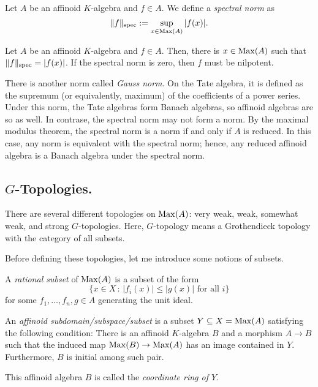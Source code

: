\documentclass{amsart}
\begin{document}
\begin{defn}
    Let $A$ be an affinoid $K$-algebra and $f \in A$. We define a \textit{spectral norm} as
    $$ \|f\|_{\operatorname{spec}} := \sup_{x \in \operatorname{Max}(A)} |f(x)|. $$
\end{defn}

\begin{thm}
    Let $A$ be an affinoid $K$-algebra and $f \in A$. Then, there is $x \in \operatorname{Max}(A)$ such that $\|f\|_{\operatorname{spec}} = |f(x)|$. If the spectral norm is zero, then $f$ must be nilpotent.
\end{thm}

There is another norm called \textit{Gauss norm}. On the Tate algebra, it is defined as the supremum (or equivalently, maximum) of the coefficients of a power series. Under this norm, the Tate algebras form Banach algebras, so affinoid algebras are so as well. In contrase, the spectral norm may not form a norm. By the maximal modulus theorem, the spectral norm is a norm if and only if $A$ is reduced. In this case, any norm is equivalent with the spectral norm; hence, any reduced affinoid algebra is a Banach algebra under the spectral norm.

\subsection{$G$-Topologies.} There are several different topologies on $\operatorname{Max}(A)$: very weak, weak, somewhat weak, and strong $G$-topologies. Here, $G$-topology means a Grothendieck topology with the category of all subsets.

Before defining these topologies, let me introduce some notions of subsets.

\begin{defn}
    A \textit{rational subset} of $\operatorname{Max}(A)$ is a subset of the form
    $$ \{x \in X \,:\, |f_i(x)| \le |g(x)| \text{ for all } i\} $$
    for some $f_1, \dots, f_n, g \in A$ generating the unit ideal.
\end{defn}

\begin{defn}
    An \textit{affinoid subdomain/subspace/subset} is a subset $Y \subseteq X = \operatorname{Max}(A)$ satisfying the following condition: There is an affinoid $K$-algebra $B$ and a morphism $A \to B$ such that the induced map $\operatorname{Max}(B) \to \operatorname{Max}(A)$ has an image contained in $Y$. Furthermore, $B$ is initial among such pair.

    This affinoid algebra $B$ is called the \textit{coordinate ring of $Y$}.
\end{defn}
\end{document}
